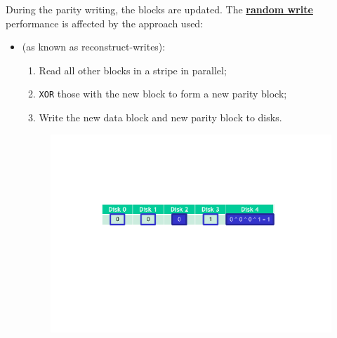 \noindent
During the parity writing, the blocks are updated. The \textbf{\underline{random write}} performance is affected by the approach used:
\begin{itemize}
    \item {} (as known as reconstruct-writes):
    \begin{enumerate}
        \item Read all other blocks in a stripe in parallel;
        \item \texttt{XOR} those with the new block to form a new parity block;
        \item Write the new data block and new parity block to disks.
    \end{enumerate}
    \begin{figure}[!htp]
        \centering
        \includegraphics[width=.8\textwidth]{img/raid-7.pdf}
    \end{figure}


\end{itemize}
